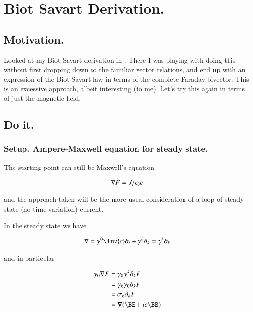 \chapter{Biot Savart Derivation.}\label{chap:biotSavart}
\date{April 18, 2009.  biotSavart.tex}

\section{Motivation. }

Looked at my Biot-Savart derivation in .  There I was playing with doing this without first dropping down to the
familiar vector relations, and end up with an expression of the Biot Savart law in terms of the complete Faraday bivector.  This is
an excessive approach, albeit interesting (to me).  Let's try this again in terms of just the magnetic field.

\section{Do it. }

\subsection{Setup. Ampere-Maxwell equation for steady state. }

The starting point can still be Maxwell's equation

\begin{align}
\nabla F = J/\epsilon_0 c
\end{align}

and the approach taken will be the more usual consideration of a loop of steady-state (no-time variation) current.

In the steady state we have

\begin{align*}
\grad = \gamma^0 \inv{c} \partial_t + \gamma^k \partial_k = \gamma^k \partial_k
\end{align*}

and in particular

\begin{align*}
\gamma_0 \grad F
&= \gamma_0 \gamma^k \partial_k F \\
&= \gamma_k \gamma_0 \partial_k F \\
&= \sigma_k \partial_k F \\
&= \spacegrad (\BE + i c \BB) \\
\end{align*}

